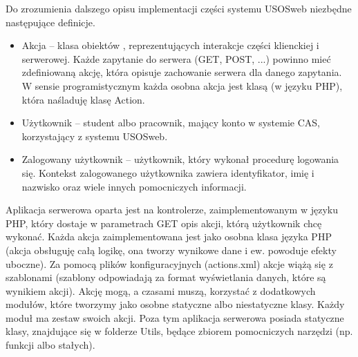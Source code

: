 \documentclass[licencjacka]{pracamgr}
\begin{document}
Do zrozumienia dalszego opisu implementacji części systemu USOSweb niezbędne następujące definicje.
\begin{itemize}
  \item
  Akcja -- klasa obiektów , reprezentujących interakcje części klienckiej i serwerowej. Każde zapytanie do serwera (GET, POST, ...) powinno mieć zdefiniowaną akcję, która opisuje zachowanie serwera dla danego zapytania. W sensie programistycznym każda osobna akcja jest klasą (w języku PHP), która naśladuję klasę Action.
  \item
  Użytkownik -- student albo pracownik, mający konto w systemie CAS, korzystający z systemu USOSweb.
  \item
  Zalogowany użytkownik -- użytkownik, który wykonał procedurę logowania się. Kontekst zalogowanego użytkownika zawiera identyfikator, imię i nazwisko oraz wiele innych pomocniczych informacji. 
\end{itemize}

Aplikacja serwerowa oparta jest na kontrolerze, zaimplementowanym w języku PHP, który dostaje w parametrach GET opis akcji, którą użytkownik chcę wykonać. Każda akcja zaimplementowana jest jako osobna klasa języka PHP (akcja obsługuję całą logikę, ona tworzy wynikowe dane i ew. powoduje efekty uboczne). Za pomocą plików konfiguracyjnych (actions.xml) akcje wiążą się z szablonami (szablony odpowiadają za format wyświetlania danych, które są wynikiem akcji). Akcję mogą, a czasami muszą, korzystać z dodatkowych modułów, które tworzymy jako osobne statyczne albo niestatyczne klasy. Każdy moduł ma zestaw swoich akcji. Poza tym aplikacja serwerowa posiada statyczne klasy, znajdujące się w folderze Utils, będące zbiorem pomocniczych narzędzi (np. funkcji albo stałych).
\end{document}
